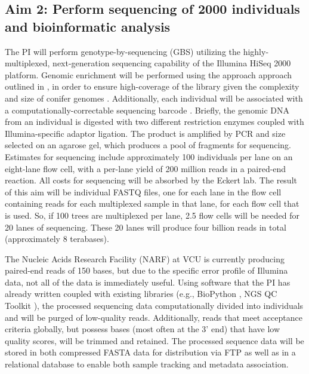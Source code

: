 \subsection*{Aim 2: Perform sequencing of 2000 individuals and bioinformatic analysis}

The PI will perform genotype-by-sequencing (GBS) utilizing the highly-multiplexed, next-generation sequencing capability of the 
Illumina HiSeq 2000 platform.  Genomic enrichment will be performed using the approach approach outlined in 
\cite{Parchman:2012ca}, in order to ensure high-coverage of the library given the complexity and size of conifer genomes 
\citep{Mackay:2012hr}.  Additionally, each individual will be associated with a computationally-correctable sequencing 
barcode \citep{Roche454MID}.  
Briefly, the genomic DNA from an individual is digested with two different restriction enzymes coupled with Illumina-specific 
adaptor ligation.  The product is amplified by PCR and size selected on an agarose gel, which produces a pool of fragments for 
sequencing.  Estimates for sequencing include approximately 100 individuals per lane on an eight-lane flow cell, with a 
per-lane yield of 200 million reads in a paired-end reaction.  All costs for sequencing will be absorbed by the Eckert lab.  
The result of this aim will be individual FASTQ files, one for each lane in the flow cell containing reads for each multiplexed 
sample in that lane, for each flow cell that is used.  So, if 100 trees are multiplexed per lane, 2.5 flow cells will be needed for 
20 lanes of sequencing.  These 20 lanes will produce four billion reads in total (approximately 8 terabases).  

The Nucleic Acids Research Facility (NARF) at VCU is currently producing paired-end reads of 150 bases, but due to the 
specific error profile of Illumina data, not all of the data is immediately useful.  Using software that the PI has already written 
\citep{code:2008wq} coupled with existing libraries (e.g., BioPython \citep{Cock:2009hj}, NGS QC Toolkit 
\citep{Patel:2012fq}), the processed sequencing data computationally divided into individuals and will be purged of 
low-quality reads. Additionally, reads that meet acceptance criteria globally, but possess bases (most often at the 3' end) 
that have low quality scores, will be trimmed and retained.  The processed sequence data will be stored in both compressed 
FASTA data for distribution via FTP as well as in a relational database to enable both sample tracking and metadata association.

